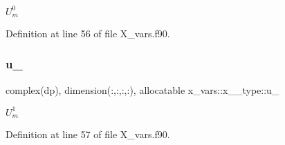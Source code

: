 $U_m^0$ 



Definition at line 56 of file X\+\_\+vars.\+f90.

\mbox{\label{structx__vars_1_1x__1__type_ab5cb4ea2b358b6787b84ffccdbc65dab}} 
\subsubsection{\texorpdfstring{u\+\_}{u\_1}}
{\footnotesize\ttfamily complex(dp), dimension(\+:,\+:,\+:,\+:), allocatable x\+\_\+vars\+::x\+\_\+\_\+type\+::u\+\_}



$U_m^1$ 



Definition at line 57 of file X\+\_\+vars.\+f90.



